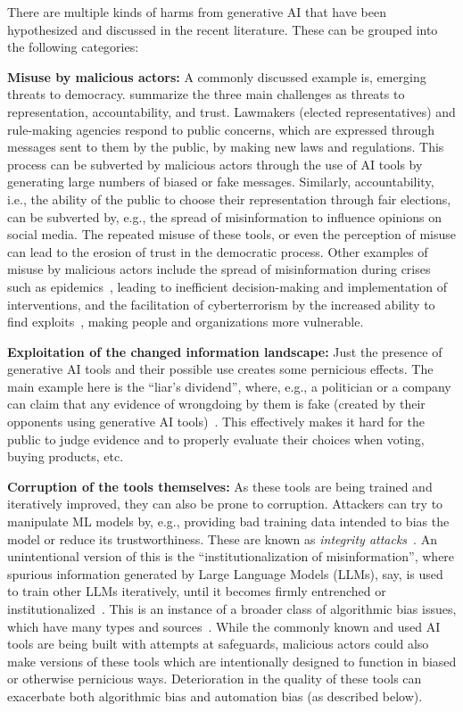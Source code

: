 There are multiple kinds of harms from generative AI that have been hypothesized and discussed in the recent literature. These can be grouped 
into the following categories:

\smallskip
\noindent
\textbf{Misuse by malicious actors:} A commonly discussed example is, emerging threats to democracy. \cite{Kreps2023democracy} summarize the three main 
challenges as threats to representation, accountability, and trust. Lawmakers (elected representatives) and 
rule-making agencies respond to public concerns, which are expressed through messages sent to them by the public, by making new laws and 
regulations. This process can be subverted by malicious actors through the use of AI tools by generating large numbers of biased or fake 
messages. Similarly, accountability, i.e., the ability of the public to choose their representation through fair elections, can be subverted by, 
e.g., the spread of misinformation to influence opinions on social media. The repeated misuse of these tools, or even the perception of misuse
can lead to the erosion of trust in the democratic process. Other examples of misuse by malicious actors include the spread of misinformation 
during crises such as epidemics~\citep{Blauth2022AIcrime}, leading to inefficient decision-making and implementation of interventions, and the 
facilitation of cyberterrorism by the increased ability to find exploits~\citep{Bernardi2024}, making people and organizations more vulnerable.

\smallskip
\noindent
\textbf{Exploitation of the changed information landscape:} Just the presence of generative AI tools and their possible use creates some
pernicious effects. The main example here is the ``liar's dividend'', where, e.g., a politician or a company can claim that any evidence of 
wrongdoing by them is fake (created by their opponents using generative AI tools)~\citep{Schiff24liar}. This effectively makes it hard for the 
public to judge evidence and to properly evaluate their choices when voting, buying products, etc.

\smallskip
\noindent
\textbf{Corruption of the tools themselves:} As these tools are being trained and iteratively improved, they can also be prone to corruption. 
Attackers can try to manipulate ML models by, e.g., providing bad training data intended to bias the model or reduce its trustworthiness. These 
are known as \emph{integrity attacks}~\citep{Blauth2022AIcrime}. An unintentional version of this is the ``institutionalization of 
misinformation'', where spurious information generated by Large Language Models (LLMs), say, is used to train other LLMs iteratively, until it 
becomes firmly entrenched or institutionalized~\citep{Garry2024llm}. This is an instance of a broader class of algorithmic bias issues, which 
have many types and sources~\citep{Fazelpour2021bias}. While the commonly known and used AI tools are being built with attempts at safeguards, 
malicious actors could also make versions of these tools which are intentionally designed to function in biased or otherwise pernicious ways. 
Deterioration in the quality of these tools can exacerbate both algorithmic bias and automation bias (as described below).

